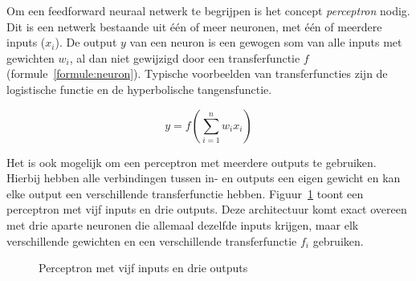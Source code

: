 Om een feedforward neuraal netwerk te begrijpen is het concept \emph{perceptron} nodig. Dit is een netwerk bestaande uit \'e\'en of meer neuronen, met \'e\'en of meerdere inputs ($x_i$). De output $y$ van een neuron is een gewogen som van alle inputs met gewichten $w_i$, al dan niet gewijzigd door een transferfunctie $f$ (formule~\eqref{formule:neuron}). Typische voorbeelden van transferfuncties zijn de logistische functie en de hyperbolische tangensfunctie.

\begin{equation}
    y = f(\sum\limits_{i=1}^{n}w_i x_i)
    \label{formule:neuron}
\end{equation}

Het is ook mogelijk om een perceptron met meerdere outputs te gebruiken. Hierbij hebben alle verbindingen tussen in- en outputs een eigen gewicht en kan elke output een verschillende transferfunctie hebben. Figuur~\ref{fig:perceptron} toont een perceptron met vijf inputs en drie outputs. Deze architectuur komt exact overeen met drie aparte neuronen die allemaal dezelfde inputs krijgen, maar elk verschillende gewichten en een verschillende transferfunctie $f_i$ gebruiken.

\begin{figure}[ht]
\def\layersep{2.5cm}
\centering
{}
\caption{Perceptron met vijf inputs en drie outputs}
\label{fig:perceptron}
\end{figure}


